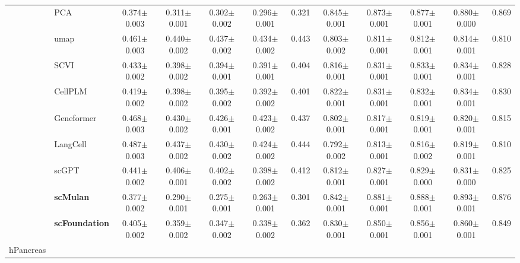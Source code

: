 \begin{table}[htbp]
\begin{tabular}{cl|ccccc|ccccc}
    & PCA      & \cellcolor{gray!25}0.374$\pm$0.003 & 0.311$\pm$0.001 & 0.302$\pm$0.002 & 0.296$\pm$0.001 & 0.321      & \cellcolor{gray!25}0.845$\pm$0.001 & 0.873$\pm$0.001 & 0.877$\pm$0.001 & 0.880$\pm$0.000 & 0.869 \\
    & umap      & 0.461$\pm$0.003 & 0.440$\pm$0.002 & 0.437$\pm$0.002 & 0.434$\pm$0.002 & 0.443      & 0.803$\pm$0.002 & 0.811$\pm$0.001 & 0.812$\pm$0.001 & 0.814$\pm$0.001 & 0.810 \\
    & SCVI      & 0.433$\pm$0.002 & 0.398$\pm$0.002 & 0.394$\pm$0.001 & 0.391$\pm$0.001 & 0.404      & 0.816$\pm$0.001 & 0.831$\pm$0.001 & 0.833$\pm$0.001 & 0.834$\pm$0.001 & 0.828 \\
    & CellPLM      & 0.419$\pm$0.002 & 0.398$\pm$0.002 & 0.395$\pm$0.002 & 0.392$\pm$0.002 & 0.401      & 0.822$\pm$0.001 & 0.831$\pm$0.001 & 0.832$\pm$0.001 & 0.834$\pm$0.001 & 0.830 \\
    & Geneformer      & 0.468$\pm$0.003 & 0.430$\pm$0.002 & 0.426$\pm$0.001 & 0.423$\pm$0.002 & 0.437      & 0.802$\pm$0.001 & 0.817$\pm$0.001 & 0.819$\pm$0.001 & 0.820$\pm$0.001 & 0.815 \\
    & LangCell      & 0.487$\pm$0.003 & 0.437$\pm$0.002 & 0.430$\pm$0.002 & 0.424$\pm$0.002 & 0.444      & 0.792$\pm$0.002 & 0.813$\pm$0.001 & 0.816$\pm$0.002 & 0.819$\pm$0.001 & 0.810 \\
    & scGPT      & 0.441$\pm$0.002 & 0.406$\pm$0.001 & 0.402$\pm$0.002 & 0.398$\pm$0.002 & 0.412      & 0.812$\pm$0.001 & 0.827$\pm$0.001 & 0.829$\pm$0.000 & 0.831$\pm$0.000 & 0.825 \\
    & \cellcolor{gray!25}\textbf{scMulan}      & 0.377$\pm$0.002 & \cellcolor{gray!25}0.290$\pm$0.001 & \cellcolor{gray!25}0.275$\pm$0.001 & \cellcolor{gray!25}0.263$\pm$0.001 & \cellcolor{gray!25}0.301      & 0.842$\pm$0.001 & \cellcolor{gray!25}0.881$\pm$0.001 & \cellcolor{gray!25}0.888$\pm$0.001 & \cellcolor{gray!25}0.893$\pm$0.001 & \cellcolor{gray!25}0.876 \\
    & \cellcolor{gray!25}\textbf{scFoundation}      & 0.405$\pm$0.002 & 0.359$\pm$0.002 & 0.347$\pm$0.002 & 0.338$\pm$0.002 & 0.362      & 0.830$\pm$0.001 & 0.850$\pm$0.001 & 0.856$\pm$0.001 & 0.860$\pm$0.001 & 0.849 \\
    \midrule

    \multirow{9}{*}{hPancreas}


\end{tabular}
\end{table}
